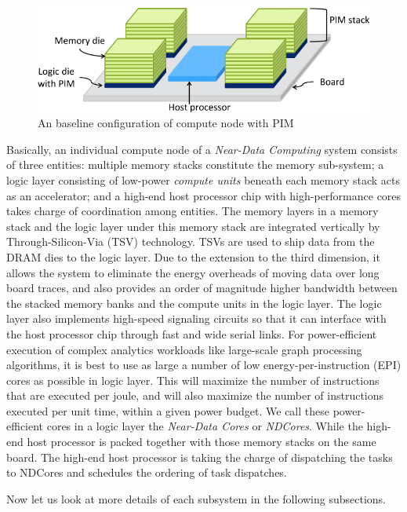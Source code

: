 \documentclass[letterpaper, 11pt, conference, margin=1in]{ieeeconf}   %
\begin{document}
\begin{figure}[ht]
  \centering
  \includegraphics[scale=0.35]{architecture.png}
  \caption{An baseline configuration of compute node with PIM}
  \label{fig:baseline}
\end{figure}

Basically, an individual compute node of a \textit{Near-Data Computing} system consists of three entities: multiple memory stacks constitute the memory sub-system; a logic layer consisting of low-power \textit{compute units} beneath each memory stack acts as an accelerator; and a high-end host processor chip with high-performance cores takes charge of coordination among entities. The memory layers in a memory stack and the logic layer under this memory stack are integrated vertically by Through-Silicon-Via (TSV) technology. TSVs are used to ship data from the DRAM dies to the logic layer. Due to the extension to the third dimension, it allows the system to eliminate the energy overheads of moving data over long board traces, and also provides an order of magnitude higher bandwidth between the stacked memory banks and the compute units in the logic layer. The logic layer also implements high-speed signaling circuits so that it can interface with the host processor chip through fast and wide serial links. For power-efficient execution of complex analytics workloads like large-scale graph processing algorithms, it is best to use as large a number of low energy-per-instruction (EPI) cores as possible in logic layer. This will maximize the number of instructions that are executed per joule, and will also maximize the number of instructions executed per unit time, within a given power budget. We call these power-efficient cores in a logic layer the \textit{Near-Data Cores} or \textit{NDCores}. While the high-end host processor is packed together with those memory stacks on the same board. The high-end host processor is taking the charge of dispatching the tasks to NDCores and schedules the ordering of task dispatches.

Now let us look at more details of each subsystem in the following subsections.
\end{document}
